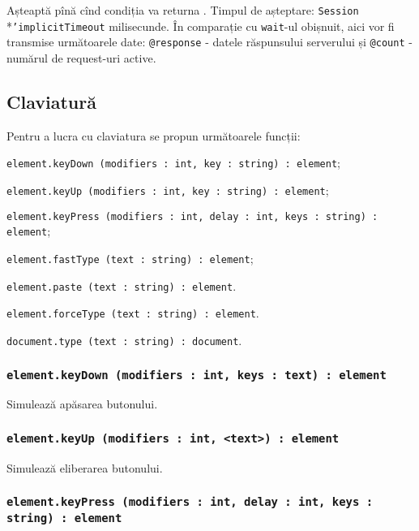Așteaptă pînă cînd condiția va returna \true. Timpul de așteptare: \texttt{Session}\\*\texttt{'implicitTimeout} milisecunde. În comparație cu \texttt{wait}-ul obișnuit, aici vor fi transmise următoarele date: \texttt{@response} - datele răspunsului serverului și \texttt{@count} - numărul de request-uri active.

\subsection{Claviatură}

Pentru a lucra cu claviatura se propun următoarele funcții:
\begin{icItems}
	\item \texttt{element.keyDown (modifiers : int, key : string) : element};
	\item \texttt{element.keyUp (modifiers : int, key : string) : element};
	\item \texttt{element.keyPress (modifiers : int, delay : int, keys : string) : element};
	\item \texttt{element.fastType (text : string) : element};
	\item \texttt{element.paste (text : string) : element}.
	\item \texttt{element.forceType (text : string) : element}.
	\item \texttt{document.type (text : string) : document}.
\end{icItems}

\subsubsection{\texttt{element.keyDown (modifiers : int, keys : text) : element}}

Simulează apăsarea butonului.

\subsubsection{\texttt{element.keyUp (modifiers : int, <text>) : element}}

Simulează eliberarea butonului.

\subsubsection{\texttt{element.keyPress (modifiers : int, delay : int, keys : string) : element}}

